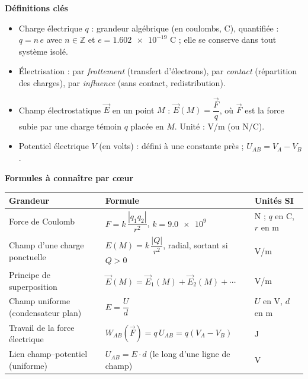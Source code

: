 \documentclass[11pt]{article}
\newcommand{\cle}[1]{{\popxbold\color{popdark}#1}}
\begin{document}
\begin{bilan}
\textbf{Définitions clés}
\begin{itemize}
  \item \cle{Charge électrique} $q$ : grandeur algébrique (en coulombs, C), \cle{quantifiée} : $q = n\,e$ avec $n \in \mathbb{Z}$ et $e = \num{1,602e-19}$ C ; elle se \cle{conserve} dans tout système isolé.
  \item \cle{Électrisation} : par \emph{frottement} (transfert d'électrons), par \emph{contact} (répartition des charges), par \emph{influence} (sans contact, redistribution).
  \item \cle{Champ électrostatique} $\vec{E}$ en un point $M$ : $\vec{E}(M) = \dfrac{\vec{F}}{q}$, où $\vec{F}$ est la force subie par une charge témoin $q$ placée en $M$. Unité : V/m (ou N/C).
  \item \cle{Potentiel électrique} $V$ (en volts) : défini à une constante près ; $U_{AB} = V_A - V_B$.
\end{itemize}

\textbf{Formules à connaître par c\oe ur}
\begin{center}
\begin{tabularx}{\linewidth}{|l|X|l|}
\hline
\rowcolor{popblueL} \textbf{Grandeur} & \textbf{Formule} & \textbf{Unités SI} \\
\hline
Force de Coulomb & $F = k\,\dfrac{|q_1 q_2|}{r^2}$, \quad $k = \num{9,0e9}$ & N ; $q$ en C, $r$ en m \\
\hline
Champ d'une charge ponctuelle & $E(M) = k\,\dfrac{|Q|}{r^2}$, radial, sortant si $Q>0$ & V/m \\
\hline
Principe de superposition & $\vec{E}(M) = \vec{E}_1(M) + \vec{E}_2(M) + \cdots$ & V/m \\
\hline
Champ uniforme (condensateur plan) & $E = \dfrac{U}{d}$ & $U$ en V, $d$ en m \\
\hline
Travail de la force électrique & $W_{AB}(\vec{F}) = q\,U_{AB} = q(V_A - V_B)$ & J \\
\hline
Lien champ--potentiel (uniforme) & $U_{AB} = E \cdot d$ (le long d'une ligne de champ) & V \\
\hline
\end{tabularx}
\end{center}


\end{bilan}
\end{document}
